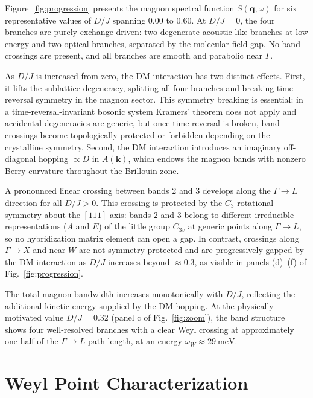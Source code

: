 \documentclass[aps,prb,twocolumn,superscriptaddress,longbibliography]{revtex4-2}
\begin{document}
Figure~\ref{fig:progression} presents the magnon spectral function
$S(\bm{q},\omega)$ for six representative values of $D/J$ spanning 0.00 to
0.60.
At $D/J = 0$, the four branches are purely exchange-driven: two
degenerate acoustic-like branches at low energy and two optical branches,
separated by the molecular-field gap.
No band crossings are present, and all branches are smooth and parabolic
near $\Gamma$.

As $D/J$ is increased from zero, the DM interaction has two distinct effects.
First, it lifts the sublattice degeneracy, splitting all four branches and
breaking time-reversal symmetry in the magnon sector.
This symmetry breaking is essential: in a time-reversal-invariant bosonic
system Kramers' theorem does not apply and accidental degeneracies are
generic, but once time-reversal is broken, band crossings become topologically
protected or forbidden depending on the crystalline symmetry.
Second, the DM interaction introduces an imaginary off-diagonal hopping
$\propto D$ in $A(\bm{k})$, which endows the magnon bands with nonzero Berry
curvature throughout the Brillouin zone.

A pronounced linear crossing between bands 2 and 3 develops along the
$\Gamma \to L$ direction for all $D/J > 0$.
This crossing is protected by the $C_3$ rotational symmetry about the
$[111]$ axis: bands 2 and 3 belong to different irreducible representations
($A$ and $E$) of the little group $C_{3v}$ at generic points along
$\Gamma \to L$, so no hybridization matrix element can open a gap.
In contrast, crossings along $\Gamma \to X$ and near $W$ are not symmetry
protected and are progressively gapped by the DM interaction as $D/J$
increases beyond $\approx 0.3$, as visible in panels (d)--(f) of
Fig.~\ref{fig:progression}.

The total magnon bandwidth increases monotonically with $D/J$, reflecting
the additional kinetic energy supplied by the DM hopping.
At the physically motivated value $D/J = 0.32$
(panel c of Fig.~\ref{fig:zoom}), the band structure shows four well-resolved
branches with a clear Weyl crossing at approximately one-half of the
$\Gamma \to L$ path length, at an energy $\omega_W \approx \SI{29}{\milli\eV}$.

\section{Weyl Point Characterization}
\label{sec:weyl}
\end{document}
